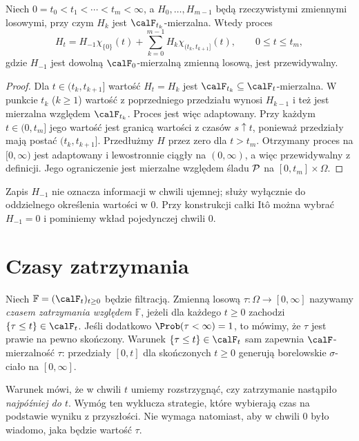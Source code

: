 \begin{stwierdzenie}
Niech $0=t_0<t_1<\cdots<t_m<\infty$, a
$H_0,\ldots,H_{m-1}$ będą rzeczywistymi zmiennymi
losowymi, przy czym $H_k$ jest $\calF_{t_k}$-mierzalna.
Wtedy proces
\[
H_t=H_{-1}\chi_{\{0\}}(t)
+\sum_{k=0}^{m-1}H_k\chi_{(t_k,t_{k+1}]}(t),
\qquad 0\le t\le t_m,
\]
gdzie $H_{-1}$ jest dowolną $\calF_0$-mierzalną
zmienną losową, jest przewidywalny.
\end{stwierdzenie}
\begin{proof}
Dla $t\in(t_k,t_{k+1}]$ wartość $H_t=H_k$ jest
$\calF_{t_k}\subseteq\calF_t$-mierzalna.
W punkcie $t_k$ ($k\ge1$) wartość z poprzedniego
przedziału wynosi $H_{k-1}$ i też jest mierzalna
względem $\calF_{t_k}$. Proces jest więc adaptowany.
Przy każdym $t\in(0,t_m]$ jego wartość jest granicą
wartości z czasów $s\uparrow t$, ponieważ przedziały
mają postać $(t_k,t_{k+1}]$. Przedłużmy $H$ przez zero
dla $t>t_m$. Otrzymany proces na $[0,\infty)$ jest
adaptowany i lewostronnie ciągły na $(0,\infty)$,
a więc przewidywalny z definicji. Jego ograniczenie
jest mierzalne względem śladu $\cal P$ na $[0,t_m]\times\Omega$.
\end{proof}

\begin{uwaga}
Zapis $H_{-1}$ nie oznacza informacji w chwili ujemnej;
służy wyłącznie do oddzielnego określenia wartości w $0$.
Przy konstrukcji całki Itô można wybrać $H_{-1}=0$
i pominiemy wkład pojedynczej chwili $0$.
\end{uwaga}

\section{Czasy zatrzymania}
\begin{definicja}
Niech $\mathbb F=(\calF_t)_{t\ge0}$ będzie filtracją.
Zmienną losową $\tau:\Omega\to[0,\infty]$
nazywamy \emph{czasem zatrzymania względem $\mathbb F$},
jeżeli dla każdego $t\ge0$ zachodzi
$\{\tau\le t\}\in\calF_t$.
Jeśli dodatkowo $\Prob(\tau<\infty)=1$, to
mówimy, że $\tau$ jest prawie na pewno skończony.
Warunek $\{\tau\le t\}\in\calF_t$ sam zapewnia
$\calF$-mierzalność $\tau$: przedziały $[0,t]$ dla
skończonych $t\ge0$ generują borelowskie $\sigma$-ciało
na $[0,\infty]$.
\end{definicja}

Warunek mówi, że w chwili $t$ umiemy rozstrzygnąć,
czy zatrzymanie nastąpiło \emph{najpóźniej do $t$}.
Wymóg ten wyklucza strategie, które wybierają czas
na podstawie wyniku z przyszłości. Nie wymaga natomiast,
aby w chwili $0$ było wiadomo, jaka będzie wartość $\tau$.

